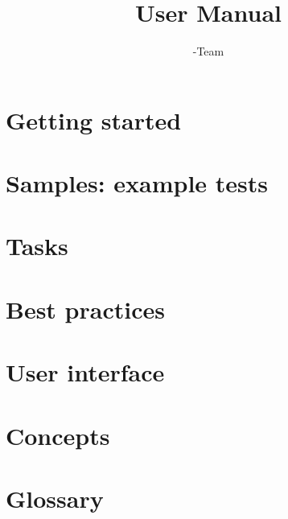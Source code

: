 \documentclass[en,a4paper,twoside,manual,guidancer]{bxreport}
\begin{document}
\title{\GDr{} User Manual}
\author*{\GD-Team}{}
\maketitle



\tableofcontents
\renewcommand{\bxcomment}[2]{}%
\clearpage
\chapter{Getting started}
\label{Gettingstarted}


\clearpage
\chapter{Samples: example tests}
\label{Samples}


\clearpage
 \chapter{Tasks}
 \label{Tasks}


\clearpage
\chapter{Best practices}
\label{BestPractices}


\clearpage
\chapter{User interface}
\label{userinterface}


\clearpage
\chapter{Concepts}
\label{Concepts}


\clearpage
\chapter{Glossary}
\label{Glossary}


\clearpage
\printindex
\end{document}
